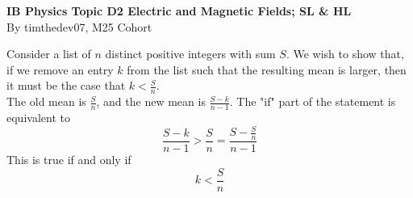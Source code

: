 \documentclass[a4paper,12pt]{article}
\newcommand{\lb}{\\[8pt]}
\begin{document}
\pagestyle{fancy}


\begin{titlepage}
  \begin{center}

    \vspace*{8cm}
    \textbf{\Large {IB Physics Topic D2 Electric and Magnetic Fields; SL \& HL}} \\
    \vspace*{1cm}
    \large{By timthedev07, M25 Cohort}


  \end{center}
\end{titlepage}

\pagebreak

Consider a list of $n$ distinct positive integers with sum $S$. We wish to show that, if we remove an entry $k$ from the list such that the resulting mean is larger, then it must be the case that $k < \frac{S}{n}$.\lb
The old mean is $\frac{S}{n}$, and the new mean is $\frac{S - k}{n - 1}$. The "if" part of the statement is equivalent to $$\frac{S - k}{n - 1} > \frac{S}{n} = \frac{S - \frac{S}{n}}{n-1}$$
This is true if and only if $$k < \frac{S}{n}$$
\end{document}
